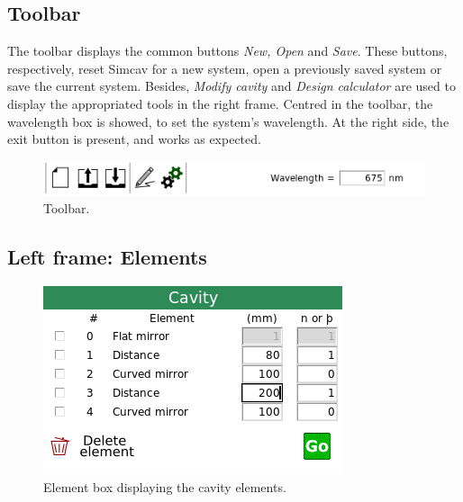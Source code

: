 \documentclass[11pt,a4paper,article,oneside]{memoir}
\begin{document}
		\subsection{Toolbar}
		The toolbar displays the common buttons \textit{New, Open} and \textit{Save}. These buttons, respectively, reset Simcav for a new system, open a previously saved system or save the current system. Besides, \textit{Modify cavity} and \textit{Design calculator} are used to display the appropriated tools in the right frame. Centred in the toolbar, the wavelength box is showed, to set the system's wavelength. At the right side, the exit button is present, and works as expected.
		
		\begin{figure}[h!]
			\centering
			\includegraphics[width=0.7\linewidth]{toolbar.png}
			\caption[Toolbar]{Toolbar.}
			\label{fig:toolbar}
		\end{figure}
		
		
		\subsection{Left frame: Elements}
		\begin{figure}
			\normalcaptionwidth
			\vspace{-12pt}	
			\centering
			\includegraphics[width=\linewidth]{element-box.png}
			\caption[Element box]{Element box displaying the cavity elements.}
			\label{fig:element-box}
		\end{figure}
\end{document}
